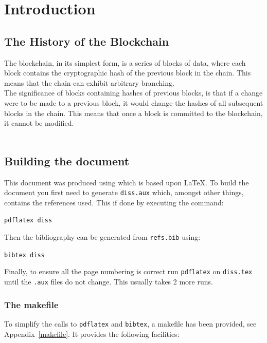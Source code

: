 \documentclass[12pt,a4paper,twoside,openright]{report}
\begin{document}
	\chapter{Introduction}
	
	\section{The History of the Blockchain}
	
	The blockchain, in its simplest form, is a series of blocks of data, where each block contains the cryptographic hash of the previous block in the chain. This means that the chain can exhibit arbitrary branching. \\
	The significance of blocks containing hashes of previous blocks, is that if a change were to be made to a previous block, it would change the hashes of all subsequent blocks in the chain. This means that once a block is committed to the blockchain, it cannot be modified. \\
	\\
	
	\section{Building the document}
	
	This document was produced using \LaTeXe which is based upon
	\LaTeX\cite{Lamport86}.  To build the document you first need to
	generate \texttt{diss.aux} which, amongst other things, contains the
	references used.  This if done by executing the command:
	
	\texttt{pdflatex diss}
	
	\noindent
	Then the bibliography can be generated from \texttt{refs.bib} using:
	
	\texttt{bibtex diss}
	
	\noindent
	Finally, to ensure all the page numbering is correct run \texttt{pdflatex}
	on \texttt{diss.tex} until the \texttt{.aux} files do not change.  This
	usually takes 2 more runs.
	
	\subsection{The makefile}
	
	To simplify the calls to \texttt{pdflatex} and \texttt{bibtex}, 
	a makefile has been provided, see Appendix~\ref{makefile}. 
	It provides the following facilities:
	
\end{document}
